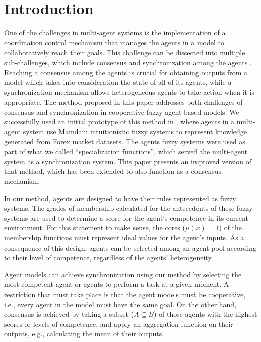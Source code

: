 \section{Introduction}
\label{section:introduction}

One of the challenges in multi-agent systems is the implementation of
a coordination control mechanism that manages the agents in a model to
collaboratively reach their goals. This challenge can be dissected
into multiple sub-challenges, which include consensus and
synchronization among the agents \cite{dorri2018multi}. Reaching a
consensus among the agents is crucial for obtaining outputs from a
model which takes into consideration the state of all of its agents,
while a synchronization mechanism allows heterogeneous agents to take
action when it is appropriate. The method proposed in this paper
addresses both challenges of consensus and synchronization in
cooperative fuzzy agent-based models. We successfully used an initial
prototype of this method in \cite{hernandez2021using}, where agents in
a multi-agent system use Mamdani intuitionistic fuzzy systems to
represent knowledge generated from Forex market datasets. The agents
fuzzy systems were used as part of what we called ``specialization
functions'', which served the multi-agent system as a synchronization
system. This paper presents an improved version of that method, which
has been extended to also function as a consensus mechanism.

In our method, agents are designed to have their rules represented as
fuzzy systems. The grades of membership calculated for the antecedents
of these fuzzy systems are used to determine a score for the agent's
competence in its current environment. For this statement to make
sense, the cores ($\mu (x) = 1$) of the membership functions must
represent ideal values for the agent's inputs. As a consequence of
this design, agents can be selected among an agent pool according to
their level of competence, regardless of the agents' heterogeneity.

Agent models can achieve synchronization using our method by selecting
the most competent agent or agents to perform a task at a given
moment. A restriction that must take place is that the agent models
must be cooperative, i.e., every agent in the model must have the same
goal. On the other hand, consensus is achieved by taking a subset ($A
\subseteq B$) of those agents with the highest scores or levels of
competence, and apply an aggregation function on their outputs, e.g.,
calculating the mean of their outputs.

